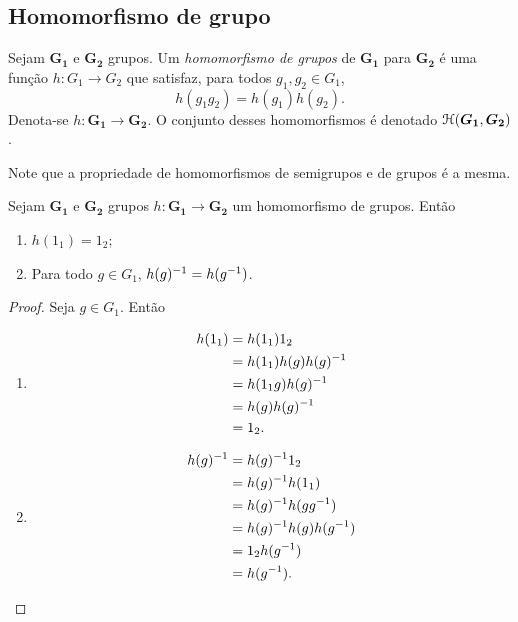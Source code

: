 \subsection{Homomorfismo de grupo}

\begin{definition}
Sejam $\bm{G_1}$ e $\bm{G_2}$ grupos. Um \emph{homomorfismo de grupos} de $\bm{G_1}$ para $\bm{G_2}$ é uma função $h: G_1 \to G_2$ que satisfaz, para todos $g_1,g_2 \in G_1$,
	\begin{equation*}
	h(g_1g_2)=h(g_1)h(g_2).
	\end{equation*}
Denota-se $h: \bm{G_1} \to \bm{G_2}$. O conjunto desses homomorfismos é denotado $\mathcal{H}(\bm{G_1},\bm{G_2})$.
\end{definition}

Note que a propriedade de homomorfismos de semigrupos e de grupos é a mesma.

\begin{proposition}
\label{prop.hom.gru}
Sejam $\bm{G_1}$ e $\bm{G_2}$ grupos $h: \bm{G_1} \to \bm{G_2}$ um homomorfismo de grupos. Então
	\begin{enumerate}
	\item $h(1_1)=1_2$;
	\item Para todo $g \in G_1$, $h(g)^{-1}=h(g^{-1})$.
	\end{enumerate}
\end{proposition}
\begin{proof}
Seja $g \in G_1$. Então
	\begin{enumerate}
	\item
		\begin{align*}
		h(1_1) &= h(1_1) 1_2 \\
			&= h(1_1) h(g) h(g)^{-1} \\
			&= h(1_1 g) h(g)^{-1} \\
			&= h(g) h(g)^{-1} \\
			&= 1_2.
		\end{align*}
	\item
		\begin{align*}
		h(g)^{-1} &= h(g)^{-1} 1_2 \\
			&= h(g)^{-1} h(1_1) \\
			&= h(g)^{-1} h(g g^{-1}) \\
			&= h(g)^{-1} h(g) h(g^{-1}) \\
			&= 1_2 h(g^{-1}) \\
			&= h(g^{-1}). \qedhere
		\end{align*}
	\end{enumerate}
\end{proof}

